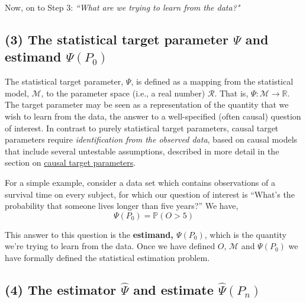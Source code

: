 \documentclass[
  12pt, krantz2,
]{book}
\theoremstyle{definition}
\theoremstyle{definition}
\theoremstyle{definition}
\newcommand{\1}{\mathbbm{1}}
\begin{document}
Now, on to Step 3: \emph{``What are we trying to learn from the data?"}

\hypertarget{the-statistical-target-parameter-psi-and-estimand-psip_0}{%
\subsection*{\texorpdfstring{(3) The statistical target parameter \(\Psi\) and estimand \(\Psi(P_0)\)}{(3) The statistical target parameter \textbackslash Psi and estimand \textbackslash Psi(P\_0)}}\label{the-statistical-target-parameter-psi-and-estimand-psip_0}}


The statistical target parameter, \(\Psi\), is defined as a mapping from the
statistical model, \(\mathcal{M}\), to the parameter space (i.e., a real number)
\(\mathcal{R}\). That is, \(\Psi: \mathcal{M}\rightarrow\mathbb{R}\). The target
parameter may be seen as a representation of the
quantity that we wish to learn from the data, the answer to a well-specified
(often causal) question of interest. In contrast to purely statistical target
parameters, causal target parameters require \emph{identification from the observed
data}, based on causal models that include several untestable assumptions,
described in more detail in the section on \protect\hyperlink{causal}{causal target parameters}.

For a simple example, consider a data set which contains observations of a
survival time on every subject, for which our question of interest is ``What's
the probability that someone lives longer than five years?'' We have,
\begin{equation*}
  \Psi(P_0) = \mathbb{P}(O > 5)
\end{equation*}

This answer to this question is the \textbf{estimand, \(\Psi(P_0)\)}, which is the
quantity we're trying to learn from the data. Once we have defined \(O\),
\(\mathcal{M}\) and \(\Psi(P_0)\) we have formally defined the statistical
estimation problem.

\hypertarget{the-estimator-hatpsi-and-estimate-hatpsip_n}{%
\subsection*{\texorpdfstring{(4) The estimator \(\hat{\Psi}\) and estimate \(\hat{\Psi}(P_n)\)}{(4) The estimator \textbackslash hat\{\textbackslash Psi\} and estimate \textbackslash hat\{\textbackslash Psi\}(P\_n)}}\label{the-estimator-hatpsi-and-estimate-hatpsip_n}}
\end{document}

